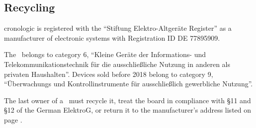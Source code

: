 \subsection{Recycling}

	cronologic is registered with the ``Stiftung Elektro-Altger\"a{}te Register'' as a manufacturer of electronic systems with Registration ID DE 77895909.\par
	The \deviceName\ belongs to category 6, ``Kleine Geräte der Informations- und Telekommunikationstechnik für die ausschließliche Nutzung in anderen als privaten Haushalten''. 
	Devices sold before 2018 belong to category 9, ``\"U{}berwachungs und Kontrollinstrumente f\"u{}r aus\-schlie\ss lich gewerbliche Nutzung''. 
	
	The last owner of a \deviceName\ must recycle it, treat the board in compliance with \S{}11 and \S{}12 of the German ElektroG, or return it to the manufacturer's address listed on page \pageref{cp:manu}.
	